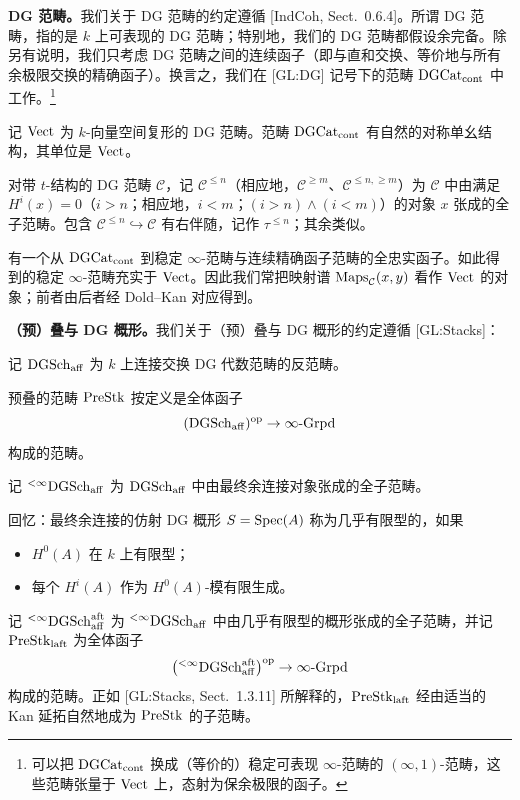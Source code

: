 \textbf{DG 范畴。}我们关于 DG 范畴的约定遵循 [IndCoh, Sect.~0.6.4]。所谓 DG 范畴，指的是 $k$ 上可表现的 DG 范畴；特别地，我们的 DG 范畴都假设余完备。除另有说明，我们只考虑 DG 范畴之间的连续函子（即与直和交换、等价地与所有余极限交换的精确函子）。换言之，我们在 [GL:DG] 记号下的范畴 $\mathrm{DGCat}_{\mathrm{cont}}$ 中工作。\footnote{可以把 $\mathrm{DGCat}_{\mathrm{cont}}$ 换成（等价的）稳定可表现 $\infty$-范畴的 $(\infty,1)$-范畴，这些范畴张量于 $\mathrm{Vect}$ 上，态射为保余极限的函子。}

记 $\mathrm{Vect}$ 为 $k$-向量空间复形的 DG 范畴。范畴 $\mathrm{DGCat}_{\mathrm{cont}}$ 有自然的对称单幺结构，其单位是 $\mathrm{Vect}$。

对带 $t$-结构的 DG 范畴 $\mathcal{C}$，记 $\mathcal{C}^{\le n}$（相应地，$\mathcal{C}^{\ge m}$、$\mathcal{C}^{\le n,\ge m}$）为 $\mathcal{C}$ 中由满足 $H^i(x)=0$（$i>n$；相应地，$i<m$；$(i>n)\wedge(i<m)$）的对象 $x$ 张成的全子范畴。包含 $\mathcal{C}^{\le n}\hookrightarrow\mathcal{C}$ 有右伴随，记作 $\tau^{\le n}$；其余类似。

有一个从 $\mathrm{DGCat}_{\mathrm{cont}}$ 到稳定 $\infty$-范畴与连续精确函子范畴的全忠实函子。如此得到的稳定 $\infty$-范畴充实于 $\mathrm{Vect}$。因此我们常把映射谱 $\mathrm{Maps}_{\mathcal{C}}(x,y)$ 看作 $\mathrm{Vect}$ 的对象；前者由后者经 Dold--Kan 对应得到。

\textbf{（预）叠与 DG 概形。}我们关于（预）叠与 DG 概形的约定遵循 [GL:Stacks]：

记 $\mathrm{DGSch}_{\mathrm{aff}}$ 为 $k$ 上连接交换 DG 代数范畴的反范畴。

预叠的范畴 $\mathrm{PreStk}$ 按定义是全体函子
\[
(\mathrm{DGSch}_{\mathrm{aff}})^{\mathrm{op}}\to\infty\text{-}\mathrm{Grpd}
\]
构成的范畴。

记 $^{<\infty}\mathrm{DGSch}_{\mathrm{aff}}$ 为 $\mathrm{DGSch}_{\mathrm{aff}}$ 中由最终余连接对象张成的全子范畴。

回忆：最终余连接的仿射 DG 概形 $S=\mathrm{Spec}(A)$ 称为几乎有限型的，如果
\begin{itemize}[nosep]
\item $H^0(A)$ 在 $k$ 上有限型；
\item 每个 $H^i(A)$ 作为 $H^0(A)$-模有限生成。
\end{itemize}
记 $^{<\infty}\mathrm{DGSch}_{\mathrm{aff}}^{\mathrm{aft}}$ 为 $^{<\infty}\mathrm{DGSch}_{\mathrm{aff}}$ 中由几乎有限型的概形张成的全子范畴，并记 $\mathrm{PreStk}_{\mathrm{laft}}$ 为全体函子
\[
\big({}^{<\infty}\mathrm{DGSch}_{\mathrm{aff}}^{\mathrm{aft}}\big)^{\mathrm{op}}\to\infty\text{-}\mathrm{Grpd}
\]
构成的范畴。正如 [GL:Stacks, Sect.~1.3.11] 所解释的，$\mathrm{PreStk}_{\mathrm{laft}}$ 经由适当的 Kan 延拓自然地成为 $\mathrm{PreStk}$ 的子范畴。

